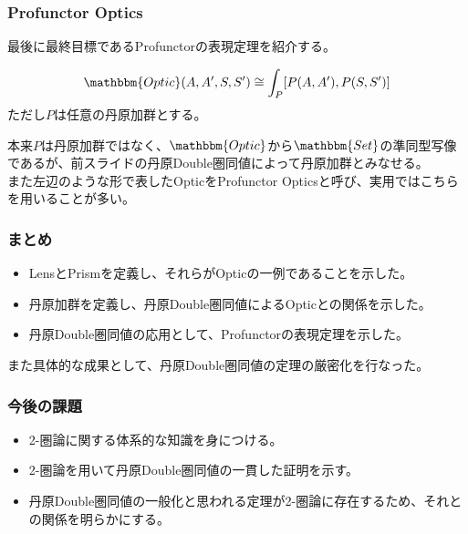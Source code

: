 \documentclass[uplatex,dvipdfmx]{beamer}
\newcommand{\cat}[1]{\mathbbm{#1}}
\newcommand{\inset}[2]{[#1,#2]}
\begin{document}
  \begin{frame}\frametitle{Profunctor Optics}
    最後に最終目標であるProfunctorの表現定理を紹介する。
    \begin{theorem}
      \[\cat{Optic}(A,A',S,S') \cong \int_P \inset{P(A,A')}{P(S,S')}\]
      ただし$P$は任意の丹原加群とする。
    \end{theorem}
    \vspace{\baselineskip}

    本来$P$は丹原加群ではなく、$\cat{Optic}$から$\cat{Set}$の準同型写像であるが、前スライドの丹原Double圏同値によって丹原加群とみなせる。\\
    \vspace{\baselineskip}
    また左辺のような形で表したOpticをProfunctor Opticsと呼び、実用ではこちらを用いることが多い。
  \end{frame}
  \begin{frame}
    \frametitle{まとめ}
    \begin{itemize}
      \item LensとPrismを定義し、それらがOpticの一例であることを示した。
      \item 丹原加群を定義し、丹原Double圏同値によるOpticとの関係を示した。
      \item 丹原Double圏同値の応用として、Profunctorの表現定理を示した。
    \end{itemize}
    \vspace{\baselineskip}

    また具体的な成果として、丹原Double圏同値の定理の厳密化を行なった。

  \end{frame}
  \begin{frame}\frametitle{今後の課題}
    \begin{itemize}
      \item 2-圏論に関する体系的な知識を身につける。\\
      \vspace{\baselineskip}

      \item 2-圏論を用いて丹原Double圏同値の一貫した証明を示す。\\
      \vspace{\baselineskip}

      \item 丹原Double圏同値の一般化と思われる定理が2-圏論に存在するため、それとの関係を明らかにする。
    \end{itemize}
  \end{frame}
\end{document}
